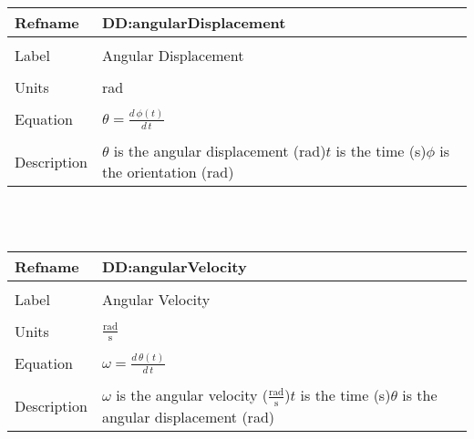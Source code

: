 \documentclass[12pt]{article}
\begin{document}
\noindent \begin{minipage}{\textwidth}
\begin{tabular}{p{} p{}}
\toprule \textbf{Refname} & \textbf{DD:angularDisplacement}
\label{DD:angularDisplacement}
\\ \midrule \\
Label & Angular Displacement
\\ \midrule \\
Units & rad
\\ \midrule \\
Equation & $\theta{}=\frac{d\,\phi{}\left(t\right)}{d\,t}$
\\ \midrule \\
Description & $\theta{}$ is the angular displacement (rad)\newline$t$ is the time (s)\newline$\phi{}$ is the orientation (rad)
\\ \bottomrule \end{tabular}
\end{minipage}\\
~\newline
\noindent \begin{minipage}{\textwidth}
\begin{tabular}{p{} p{}}
\toprule \textbf{Refname} & \textbf{DD:angularVelocity}
\label{DD:angularVelocity}
\\ \midrule \\
Label & Angular Velocity
\\ \midrule \\
Units & $\frac{\text{rad}}{\text{s}}$
\\ \midrule \\
Equation & $\omega{}=\frac{d\,\theta{}\left(t\right)}{d\,t}$
\\ \midrule \\
Description & $\omega{}$ is the angular velocity ($\frac{\text{rad}}{\text{s}}$)\newline$t$ is the time (s)\newline$\theta{}$ is the angular displacement (rad)
\\ \bottomrule \end{tabular}
\end{minipage}\\
~\newline
\end{document}
